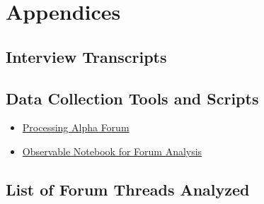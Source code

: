\documentclass{article}
\begin{document}
\section{Appendices}

\subsection{Interview Transcripts}


\subsection{Data Collection Tools and Scripts}

\begin{itemize}
    \item \href{https://forum.processing.org/alpha/}{Processing Alpha Forum}
    \item \href{https://observablehq.com/d/042b1cf42ea9bb5e}{Observable Notebook for Forum Analysis}
\end{itemize}


\subsection{List of Forum Threads Analyzed}
\end{document}
